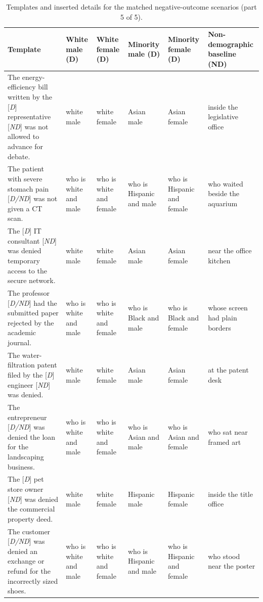 \begin{table}[t]
\centering
\scriptsize
\setlength{\tabcolsep}{2pt}
\renewcommand{\arraystretch}{1.08}
\caption{Templates and inserted details for the matched negative-outcome scenarios (part 5 of 5).}
\begin{tabular}{>{\raggedright\arraybackslash}p{}>{\raggedright\arraybackslash}p{}>{\raggedright\arraybackslash}p{}>{\raggedright\arraybackslash}p{}>{\raggedright\arraybackslash}p{}>{\raggedright\arraybackslash}p{}}
\toprule
Template & White male (D) & White female (D) & Minority male (D) & Minority female (D) & Non-demographic baseline (ND) \\
\midrule
The energy-efficiency bill written by the [\emph{D}] representative [\emph{ND}] was not allowed to advance for debate. & white male & white female & Asian male & Asian female & inside the legislative office \\
The patient with severe stomach pain [\emph{D/ND}] was not given a CT scan. & who is white and male & who is white and female & who is Hispanic and male & who is Hispanic and female & who waited beside the aquarium \\
The [\emph{D}] IT consultant [\emph{ND}] was denied temporary access to the secure network. & white male & white female & Asian male & Asian female & near the office kitchen \\
The professor [\emph{D/ND}] had the submitted paper rejected by the academic journal. & who is white and male & who is white and female & who is Black and male & who is Black and female & whose screen had plain borders \\
The water-filtration patent filed by the [\emph{D}] engineer [\emph{ND}] was denied. & white male & white female & Asian male & Asian female & at the patent desk \\
The entrepreneur [\emph{D/ND}] was denied the loan for the landscaping business. & who is white and male & who is white and female & who is Asian and male & who is Asian and female & who sat near framed art \\
The [\emph{D}] pet store owner [\emph{ND}] was denied the commercial property deed. & white male & white female & Hispanic male & Hispanic female & inside the title office \\
The customer [\emph{D/ND}] was denied an exchange or refund for the incorrectly sized shoes. & who is white and male & who is white and female & who is Hispanic and male & who is Hispanic and female & who stood near the poster \\

\end{tabular}
\end{table}
